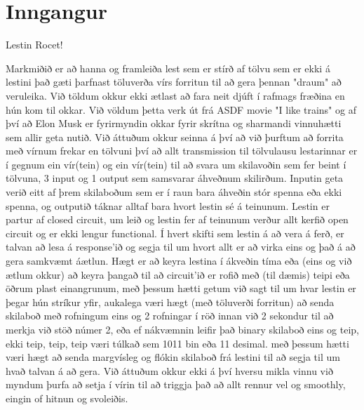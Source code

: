 \section{Inngangur}
Lestin Rocet! \cite{mcgowan2010rail}

Markmiðið er að hanna og framleiða lest sem er stírð af tölvu sem er ekki á lestini
það gæti þarfnast töluverða vírs forritun til að gera þennan "draum" að veruleika.
Við töldum okkur ekki ætlast að fara neit djúft í rafmags fræðina en hún kom til okkar.
Við völdum þetta verk út frá ASDF movie "I like trains" og af því að Elon Musk er 
fyrirmyndin okkar fyrir skrítna og sharmandi vinnuhætti sem allir geta nutið.
Við áttuðum okkur seinna á því að við þurftum að forrita með vírnum frekar en tölvuni
því að allt transmission til tölvulausu lestarinnar er í gegnum ein vír(tein) og 
ein vír(tein) til að svara um skilavoðin sem fer beint í tölvuna,
3 input og 1 output sem samsvarar áhveðnum skilirðum.
Inputin geta verið eitt af þrem skilaboðum sem er í raun bara áhveðin stór spenna
eða ekki spenna, og outputið táknar alltaf bara hvort lestin sé á teinunum.
Lestin er partur af closed circuit, um leið og lestin fer af teinunum verður 
allt kerfið open circuit og er ekki lengur functional.
Í hvert skifti sem lestin á að vera á ferð, er talvan að lesa á response'ið og 
segja til um hvort allt er að virka eins og það á að gera samkvæmt áætlun.
Hægt er að keyra lestina í ákveðin tíma eða (eins og við ætlum okkur) að keyra 
þangað til að circuit'ið er rofið með (til dæmis) teipi eða öðrum plast einangrunum,
með þessum hætti getum við sagt til um hvar lestin er þegar hún stríkur yfir, 
aukalega væri hægt (með töluverði forritun) að senda skilaboð með rofningum
eins og 2 rofningar í röð innan við 2 sekondur  til að merkja við stöð númer 2,
eða ef nákvæmnin leifir það binary skilaboð eins og teip, ekki teip, teip, teip
væri túlkað sem 1011 bin eða 11 desimal. með þessum hætti væri hægt að senda margvísleg
og flókin skilaboð frá lestini til að segja til um hvað talvan á að gera.
Við áttuðum okkur ekki á því hversu mikla vinnu við myndum þurfa að setja í vírin til
að triggja það að allt rennur vel og smoothly, eingin of hitnun og svoleiðis.
